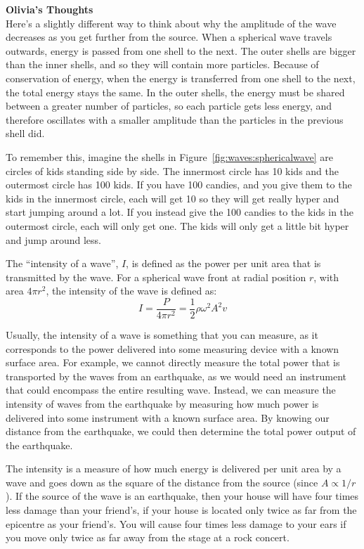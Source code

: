 \begin{framed}
\textbf{Olivia's Thoughts}\\
Here's a slightly different way to think about why the amplitude of the wave decreases as you get further from the source. When a spherical wave travels outwards, energy is passed from one shell to the next. The outer shells are bigger than the inner shells, and so they will contain more particles. Because of conservation of energy, when the energy is transferred from one shell to the next, the total energy stays the same. In the outer shells, the energy must be shared between a greater number of particles, so each particle gets less energy, and therefore oscillates with a smaller amplitude than the particles in the previous shell did.

To remember this, imagine the shells in Figure~\ref{fig:waves:sphericalwave} are circles of kids standing side by side. The innermost circle has 10 kids and the outermost circle has 100 kids. If you have 100 candies, and you give them to the kids in the innermost circle, each will get 10 so they will get really hyper and start jumping around a lot. If you instead give the 100 candies to the kids in the outermost circle, each will only get one. The kids will only get a little bit hyper and jump around less.
\end{framed}

The ``intensity of a wave'', $I$, is defined as the power per unit area that is transmitted by the wave. For a spherical wave front at radial position $r$, with area $4\pi r^2$, the intensity of the wave is defined as:
\begin{equation}
I = \frac{P}{4\pi r^2} = \frac{1}{2}\rho  \omega^2 A^2 v
\end{equation}

Usually, the intensity of a wave is something that you can measure, as it corresponds to the power delivered into some measuring device with a known surface area. For example, we cannot directly measure the total power that is transported by the waves from an earthquake, as we would need an instrument that could encompass the entire resulting wave. Instead, we can measure the intensity of waves from the earthquake by measuring how much power is delivered into some instrument with a known surface area. By knowing our distance from the earthquake, we could then determine the total power output of the earthquake.

The intensity is a measure of how much energy is delivered per unit area by a wave and goes down as the square of the distance from the source (since $A\propto 1/r$). If the source of the wave is an earthquake, then your house will have four times less damage than your friend's, if your house is located only twice as far from the epicentre as your friend's. You will cause four times less damage to your ears if you move only twice as far away from the stage at a rock concert.

